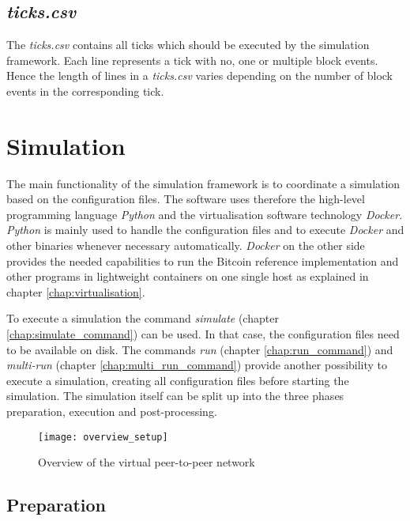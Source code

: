 \subsection{\textit{ticks.csv}}

The \textit{ticks.csv} contains all ticks which should be executed by the simulation framework.
Each line represents a tick with no, one or multiple block events.
Hence the length of lines in a \textit{ticks.csv} varies depending on the number of block events in the corresponding tick.

\section{Simulation}
\label{chap:simulation}

The main functionality of the simulation framework is to coordinate a simulation based on the configuration files.
The software uses therefore the high-level programming language \textit{Python} and the virtualisation software technology \textit{Docker}.
\textit{Python} is mainly used to handle the configuration files and to execute \textit{Docker} and other binaries whenever necessary automatically.
\textit{Docker} on the other side provides the needed capabilities to run the Bitcoin reference implementation and other programs in lightweight containers on one single host as explained in chapter \ref{chap:virtualisation}.
	
To execute a simulation the command \textit{simulate} (chapter \ref{chap:simulate_command}) can be used.
In that case, the configuration files need to be available on disk.
The commands \textit{run} (chapter \ref{chap:run_command}) and \textit{multi-run} (chapter \ref{chap:multi_run_command}) provide another possibility to execute a simulation, creating all configuration files before starting the simulation.
The simulation itself can be split up into the three phases preparation, execution and post-processing.

\begin{figure}[t]
\texttt{[image: overview\_setup]}
\centering
\caption{Overview of the virtual peer-to-peer network}
\label{fig:overview}
\end{figure}

\subsection{Preparation}

